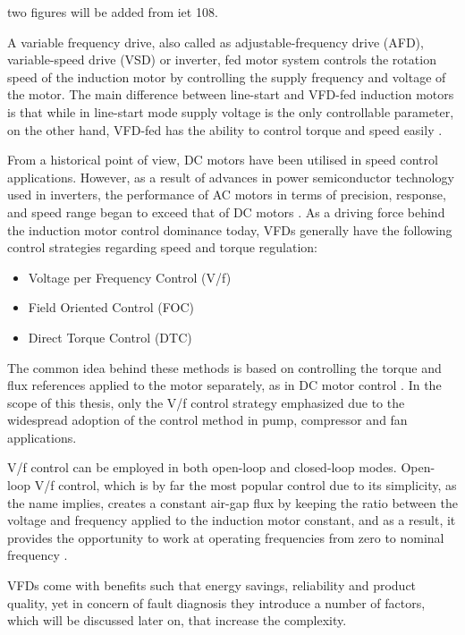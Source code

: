 two figures will be added from iet 108.

A variable frequency drive, also called as adjustable-frequency drive (AFD), variable-speed drive (VSD) or inverter, fed motor system controls the rotation speed of the induction motor by controlling the supply frequency and voltage of the motor. The main difference between line-start and VFD-fed induction motors is that while in line-start mode supply voltage is the only controllable parameter, on the other hand, VFD-fed has the ability to control torque and speed easily \cite{faiz2017fault}.

From a historical point of view, DC motors have been utilised in speed control applications. However, as a result of advances in power semiconductor technology used in inverters, the performance of AC motors in terms of precision, response, and speed range began to exceed that of DC motors \cite{doe2008improving,mikami2011historical}. As a driving force behind the induction motor control dominance today, VFDs generally have the following control strategies regarding speed and torque regulation:

\begin{itemize}
	\item Voltage per Frequency Control (V/f)
	\item Field Oriented Control (FOC)
	\item Direct Torque Control (DTC)
\end{itemize}

The common idea behind these methods is based on controlling the torque and flux references applied to the motor separately, as in DC motor control \cite{faiz2017fault}. In the scope of this thesis, only the V/f control strategy emphasized due to the widespread adoption of the control method in pump, compressor and fan applications. 

V/f control can be employed in both open-loop and closed-loop modes. Open-loop V/f control, which is by far the most popular control due to its simplicity, as the name implies, creates a constant air-gap flux by keeping the ratio between the voltage and frequency applied to the induction motor constant, and as a result, it provides the opportunity to work at operating frequencies from zero to nominal frequency \cite{bose2002modern}. 

VFDs come with benefits such that energy savings, reliability and product quality, yet in concern of fault diagnosis they introduce a number of factors, which will be discussed later on, that increase the complexity. 

